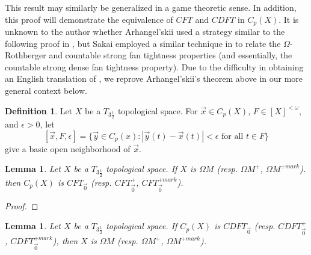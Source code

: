 \documentclass{amsart}
\theoremstyle{plain}
\newtheorem{lemma}[theorem]{Lemma}
\theoremstyle{definition}
\newtheorem{definition}[theorem]{Definition}
\theoremstyle{remark}
\theoremstyle{plain}
\theoremstyle{definition}
\theoremstyle{remark}
\begin{document}
This result may similarly be generalized in a game theoretic sense.
In addition, this proof will demonstrate the equivalence of
\(CFT\) and \(CDFT\) in \(C_p(X)\).
It is unknown to the author whether Arhangel'skii
used a strategy similar to the following proof in \cite{MR837289},
but Sakai employed a similar technique
in \cite{MR964873} to relate the \(\Omega\)-Rothberger and
countable strong fan tightness properties
(and essentially, the countable strong dense fan tightness property).
Due to the difficulty in obtaining an English translation of
\cite{MR837289}, we reprove Arhangel'skii's theorem above in our
more general context below.

\begin{definition}
  Let \(X\) be a \(T_{3\frac{1}{2}}\) topological space.
  For \(\vec x\in C_p(X)\), \(F\in[X]^{<\omega}\), and
  \(\epsilon>0\), let
  \[
    [\vec x,F,\epsilon]
      =
    \{
      \vec y\in C_p(x)
    :
      |\vec y(t)-\vec x(t)|<\epsilon
    \text{ for all }
      t\in F
    \}
  \]
  give a basic open neighborhood of \(\vec x\).
\end{definition}

\begin{lemma}
  Let \(X\) be a \(T_{3\frac{1}{2}}\) topological space.
  If \(X\) is \(\Omega M\)
  (resp. \(\Omega M^+\), \(\Omega M^{+mark}\)).
  then \(C_p(X)\) is \(CFT_{\vec 0}\)
  (resp. \(CFT_{\vec 0}^+\), \(CFT_{\vec 0}^{+mark}\)).
\end{lemma}

\begin{proof}

\end{proof}

\begin{lemma}
  Let \(X\) be a \(T_{3\frac{1}{2}}\) topological space.
  If \(C_p(X)\) is \(CDFT_{\vec 0}\)
  (resp. \(CDFT_{\vec 0}^+\), \(CDFT_{\vec 0}^{+mark}\)),
  then \(X\) is \(\Omega M\)
  (resp. \(\Omega M^+\), \(\Omega M^{+mark}\)).
\end{lemma}
\end{document}
